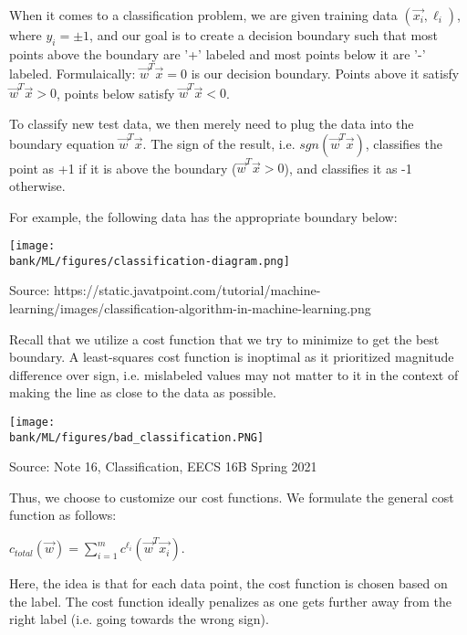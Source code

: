 

When it comes to a classification problem, we are given training data $(\vec{x_i}, \ell_i)$, where $y_i = \pm 1$, and our goal is to create a decision boundary such that most points above the boundary are '+' labeled and most points below it are '-' labeled. Formulaically: $ \vec{w}^{T} \vec{x} = 0$ is our decision boundary. Points above it satisfy $ \vec{w}^{T} \vec{x} > 0$, points below satisfy $ \vec{w}^{T} \vec{x} < 0$. 

To classify new test data, we then merely need to plug the data into the boundary equation $ \vec{w}^{T} \vec{x} $. The sign of the result, i.e.
$ sgn(\vec{w}^{T} \vec{x}) $, classifies the point as +1 if it is above the boundary ($ \vec{w}^{T} \vec{x} > 0$), and classifies it as -1 otherwise.

For example, the following data has the appropriate boundary below:

\begin{center}
    \texttt{[image: \\bank/ML/figures/classification-diagram.png]}
\end{center}

Source: https://static.javatpoint.com/tutorial/machine-learning/images/classification-algorithm-in-machine-learning.png


Recall that we utilize a cost function that we try to minimize to get the best boundary. A least-squares cost function is inoptimal as it prioritized magnitude difference over sign, i.e. mislabeled values may not matter to it in the context of making the line as close to the data as possible.

\begin{center}
    \texttt{[image: \\bank/ML/figures/bad\_classification.PNG]}
\end{center}

Source: Note 16, Classification, EECS 16B Spring 2021

Thus, we choose to customize our cost functions. We formulate the general cost function as follows:

$c_{total}(\vec{w}) = \sum_{i = 1}^{m}{c^{\ell_i}(\vec{w}^{T} \vec{x_i})}$.

Here, the idea is that for each data point, the cost function is chosen based on the label. The cost function ideally penalizes as one gets further away from the right label (i.e. going towards the wrong sign). 

